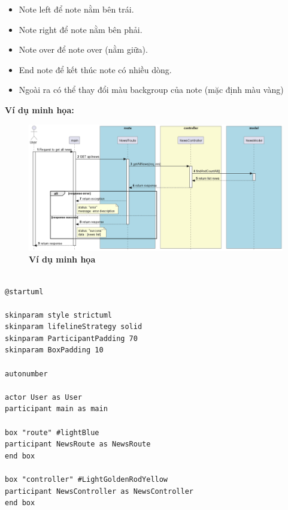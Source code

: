 \begin{enumerate}[a)]
  
\begin{adjustwidth}{1.5em}{}
  \begin{itemize}

    \item Note left để note nằm bên trái.
    \item Note right để note nằm bên phải.
    \item Note over để note over (nằm giữa).
    \item End note để kết thúc note có nhiều dòng.
    \item	Ngoài ra có thể thay đổi màu backgroup của note (mặc định màu vàng)
    
    
  \end{itemize}
  \end{adjustwidth}

  \textbf{Ví dụ minh họa:}

  \begin{figure}[H]
    \centering
    \includegraphics[scale=0.42]{Images/server/sequence/server/getAllNews.png}
    \caption[Ví dụ minh họa]{\bfseries \fontsize{12pt}{0pt}
    \selectfont Ví dụ minh họa}
    \label{plantuml_object} %
  \end{figure}



\begin{lstlisting}

@startuml

skinparam style strictuml
skinparam lifelineStrategy solid
skinparam ParticipantPadding 70
skinparam BoxPadding 10

autonumber

actor User as User
participant main as main

box "route" #lightBlue
participant NewsRoute as NewsRoute
end box

box "controller" #LightGoldenRodYellow
participant NewsController as NewsController
end box


\end{lstlisting}
\end{enumerate}

